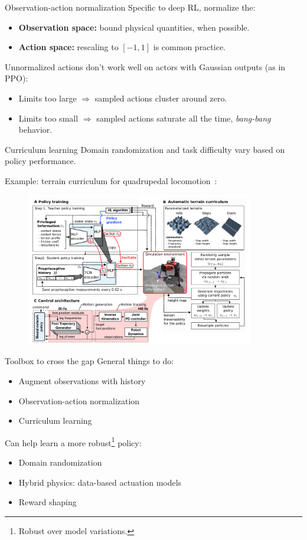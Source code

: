 \documentclass[10pt, aspectratio=1610]{beamer}
\begin{document}
\begin{frame}{Observation-action normalization}
    Specific to deep RL, normalize the:
    \begin{itemize}
        \item \textbf{Observation space:} bound physical quantities, when possible.
        \item \textbf{Action space:} rescaling to $[-1, 1]$ is common practice.
    \end{itemize}
    Unnormalized actions don't work well on actors with Gaussian outputs (as in PPO):
    \begin{itemize}
        \item Limits too large $\Rightarrow$ sampled actions cluster around zero.
        \item Limits too small $\Rightarrow$ sampled actions saturate all the time, \emph{bang-bang} behavior.
    \end{itemize}
\end{frame}

\begin{frame}{Curriculum learning}
    Domain randomization and task difficulty vary based on policy performance.

    Example: terrain curriculum for quadrupedal locomotion~\cite{lee2020}:
    \begin{figure}
        \includegraphics[height=6.7cm]{figures/quadruped-curriculum.png}
    \end{figure}
\end{frame}

\begin{frame}{Toolbox to cross the gap}
    General things to do:
    \begin{itemize}
        \item Augment observations with history
        \item Observation-action normalization
        \item Curriculum learning
    \end{itemize}
    Can help learn a more robust\footnote{Robust over model variations.} policy:
    \begin{itemize}
        \item Domain randomization
        \item Hybrid physics: data-based actuation models
        \item Reward shaping
    \end{itemize}
\end{frame}
\end{document}
